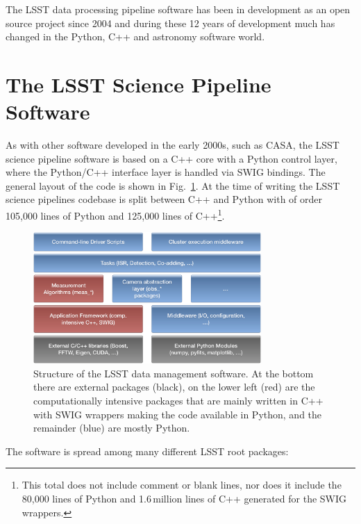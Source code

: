 \documentclass[]{spie}  %
\begin{document}
The LSST data processing pipeline software has been in development as an open source project since 2004\cite{2004AAS...20510811A,2010SPIE.7740E..15A,2016_adassxxv_P056} and during these 12 years of development much has changed in the Python, C++ and astronomy software world.


\section{The LSST Science Pipeline Software}

As with other software developed in the early 2000s, such as CASA\cite{2012ASPC..461..849P}, the LSST science pipeline software is based on a C++ core with a Python control layer, where the Python/C++ interface layer is handled via SWIG\cite{beazley2003automated} bindings.
The general layout of the code is shown in Fig.~\ref{fig:layers}.
At the time of writing the LSST science pipelines codebase is split between C++ and Python with of order 105,000 lines of Python and 125,000 lines of C++\footnote{This total does not include comment or blank lines, nor does it include the 80,000 lines of Python and 1.6\,million lines of C++ generated for the SWIG wrappers.}.

\begin{figure} [t]
\begin{center}
\includegraphics[height=5cm]{Software-Layers}
\end{center}
\caption[layers]
{\label{fig:layers}
Structure of the LSST data management software.
At the bottom there are external packages (black), on the lower left (red) are the computationally intensive packages that are mainly written in C++ with SWIG wrappers making the code available in Python, and the remainder (blue) are mostly Python.}
\end{figure}

The software is spread among many different LSST root packages:
\end{document}
